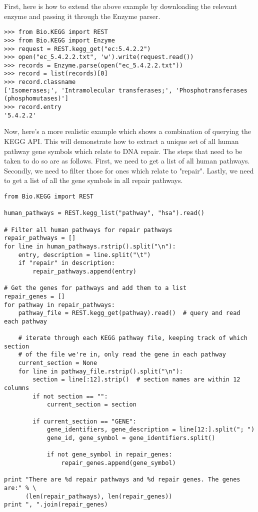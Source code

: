 First, here is how to extend the above example by downloading the relevant enzyme and passing it through the Enzyme parser.

\begin{verbatim}
>>> from Bio.KEGG import REST
>>> from Bio.KEGG import Enzyme
>>> request = REST.kegg_get("ec:5.4.2.2")
>>> open("ec_5.4.2.2.txt", 'w').write(request.read())
>>> records = Enzyme.parse(open("ec_5.4.2.2.txt"))
>>> record = list(records)[0]
>>> record.classname
['Isomerases;', 'Intramolecular transferases;', 'Phosphotransferases (phosphomutases)']
>>> record.entry
'5.4.2.2'
\end{verbatim}

Now, here's a more realistic example which shows a combination of querying the KEGG API. This will demonstrate how to extract a unique set of all human pathway gene symbols which relate to DNA repair. The steps that need to be taken to do so are as follows. First, we need to get a list of all human pathways. Secondly, we need to filter those for ones which relate to "repair". Lastly, we need to get a list of all the gene symbols in all repair pathways.

\begin{verbatim}
from Bio.KEGG import REST

human_pathways = REST.kegg_list("pathway", "hsa").read()

# Filter all human pathways for repair pathways
repair_pathways = []
for line in human_pathways.rstrip().split("\n"):
    entry, description = line.split("\t")
    if "repair" in description:
        repair_pathways.append(entry)

# Get the genes for pathways and add them to a list
repair_genes = [] 
for pathway in repair_pathways:
    pathway_file = REST.kegg_get(pathway).read()  # query and read each pathway

    # iterate through each KEGG pathway file, keeping track of which section
    # of the file we're in, only read the gene in each pathway
    current_section = None
    for line in pathway_file.rstrip().split("\n"):
        section = line[:12].strip()  # section names are within 12 columns
        if not section == "":
            current_section = section
        
        if current_section == "GENE":
            gene_identifiers, gene_description = line[12:].split("; ")
            gene_id, gene_symbol = gene_identifiers.split()

            if not gene_symbol in repair_genes:
                repair_genes.append(gene_symbol)

print "There are %d repair pathways and %d repair genes. The genes are:" % \
      (len(repair_pathways), len(repair_genes))
print ", ".join(repair_genes)
\end{verbatim}

